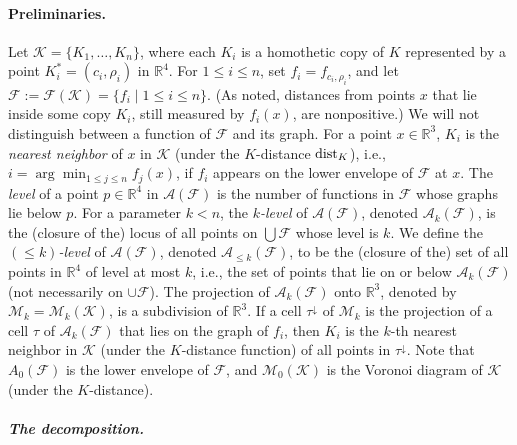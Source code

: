 \documentclass[11pt]{article}
\newif\ifsocgproc
\def\reals{{\mathbb R}}
\def\dist{{\rm dist}}
\def\A{\mathcal{A}}
\def\F{\mathcal{F}}
\def\K{\mathcal{K}}
\def\M{\mathcal{M}}
\def\cell{\tau}
\def\marrow{\marginpar[\hfill$\longrightarrow$]{$\longleftarrow$}}
\def\micha#1{{\color{magenta} \textsc{(Micha says: }\marrow\textsf{#1})}}
\def\pankaj#1{{\color{blue} \textsc{(Pankaj says: }\marrow\textsf{#1})}}
\theoremstyle{definition}
\begin{document}
\paragraph{Preliminaries.}
\fi
Let $\K = \{K_1, \ldots, K_n\}$, where each $K_i$ 
is a homothetic copy of $K$ represented by a point $K_i^* = (c_i,\rho_i)$ in $\reals^4$.
For $1 \le i \le n$, set $f_i = f_{c_i,\rho_i}$, and let 
$\F := \F(\K) = \{ f_i \mid 1 \le i \le n\}$.
(As noted, distances from points $x$ that lie inside some copy $K_i$, still measured by $f_i(x)$, are nonpositive.)
We will not distinguish between a function of $\F$ and its graph.
For a point $x\in\reals^3$, $K_i$ is the \emph{nearest neighbor} of $x$ in $\K$ 
(under the $K$-distance $\dist_K$), i.e., $i = \arg\min_{1 \le j \le n} f_j(x)$, if
$f_i$ appears on the lower envelope of $\F$ at $x$. 
%
The \emph{level} of a point $p\in\reals^4$ in $\A(\F)$ is the number of functions in $\F$ whose graphs lie below $p$.
For a parameter $k < n$, the \emph{$k$-level} of $\A(\F)$, denoted $\A_k(\F)$, is the 
(closure of the) locus of all points on $\bigcup \F$ whose level is $k$.
We define the \emph{$(\le k)$-level} of $\A(\F)$, denoted $\A_{\le k}(\F)$, to be 
the (closure of the) set of all points in $\reals^4$ of level at most $k$, i.e., 
the set of points that lie on or below $\A_k(\F)$ (not necessarily on $\cup\F$).
The projection of $\A_k(\F)$ onto $\reals^3$, 
denoted by $\M_k = \M_k (\K)$, is a subdivision of $\reals^3$. 
If a cell $\cell^\downarrow$ of $\M_k$ is the projection of a cell $\cell$ of 
$\A_k(\F)$ that lies on the graph of $f_i$, 
then $K_i$ is the $k$-th nearest neighbor in $\K$ (under the $K$-distance function)
of all points in $\cell^\downarrow$. Note that $A_0(\F)$ is the lower envelope of $\F$, 
and $\M_0(\K)$ is the Voronoi diagram of $\K$ (under the $K$-distance).
%
\ifsocgproc 
\subparagraph*{The decomposition.}
\else
\end{document}
